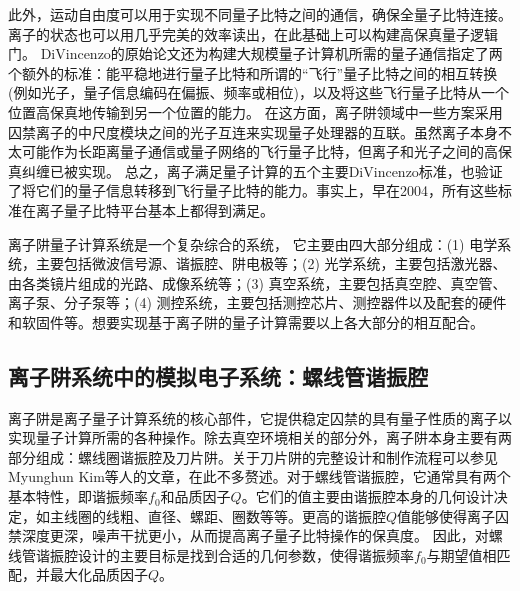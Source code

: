 此外，运动自由度可以用于实现不同量子比特之间的通信，确保全量子比特连接\cite[]{Debnath_Linke_Figgatt_Landsman_Wright_Monroe_2016}。离子的状态也可以用几乎完美的效率读出\cite[]{Myerson_Szwer_Webster_Allcock_Curtis_Imreh_Sherman_Stacey_Steane_Lucas_2008}，在此基础上可以构建高保真量子逻辑门\cite[]{Ballance_Harty_Linke_Sepiol_Lucas_2016}。
DiVincenzo的原始论文还为构建大规模量子计算机所需的量子通信指定了两个额外的标准：能平稳地进行量子比特和所谓的“飞行”量子比特之间的相互转换(例如光子，量子信息编码在偏振、频率或相位)，以及将这些飞行量子比特从一个位置高保真地传输到另一个位置的能力。
在这方面，离子阱领域中一些方案采用囚禁离子的中尺度模块之间的光子互连来实现量子处理器的互联\cite[]{Monroe_Raussendorf_Ruthven_Brown_Maunz_Duan_Kim_2014}。虽然离子本身不太可能作为长距离量子通信或量子网络的飞行量子比特，但离子和光子之间的高保真纠缠已被实现\cite[]{Moehring_Blinov_Madsen_Duan_Monroe_2004}。
总之，离子满足量子计算的五个主要DiVincenzo标准，也验证了将它们的量子信息转移到飞行量子比特的能力。事实上，早在2004，所有这些标准在离子量子比特平台基本上都得到满足\cite[]{Leibfried_DeMarco_Meyer_Lucas_Barrett_Britton_Itano_Jelenković_Langer_Rosenband_et_al_2003,Moehring_Blinov_Madsen_Duan_Monroe_2004}。

离子阱量子计算系统是一个复杂综合的系统，
它主要由四大部分组成：(1) 电学系统，主要包括微波信号源、谐振腔、阱电极等；(2) 光学系统，主要包括激光器、由各类镜片组成的光路、成像系统等；(3) 真空系统，主要包括真空腔、真空管、离子泵、分子泵等；(4) 测控系统，主要包括测控芯片、测控器件以及配套的硬件和软固件等。想要实现基于离子阱的量子计算需要以上各大部分的相互配合。

\subsection[离子阱系统中的模拟电子系统：螺线管谐振腔]{离子阱系统中的模拟电子系统：螺线管谐振腔}

离子阱是离子量子计算系统的核心部件，它提供稳定囚禁的具有量子性质的离子以实现量子计算所需的各种操作。除去真空环境相关的部分外，离子阱本身主要有两部分组成：螺线圈谐振腔及刀片阱。关于刀片阱的完整设计和制作流程可以参见Myunghun Kim等人\cite[]{Kim_Kim_Hong_Lee_Moon_Lee_Kim_Ha_Sim_Lee_2022}的文章，在此不多赘述。对于螺线管谐振腔，它通常具有两个基本特性，即谐振频率$f_0$和品质因子$Q$。它们的值主要由谐振腔本身的几何设计决定，如主线圈的线粗、直径、螺距、圈数等等。更高的谐振腔$Q$值能够使得离子囚禁深度更深，噪声干扰更小，从而提高离子量子比特操作的保真度。
因此，对螺线管谐振腔设计的主要目标是找到合适的几何参数，使得谐振频率$f_0$与期望值相匹配，并最大化品质因子$Q$。

